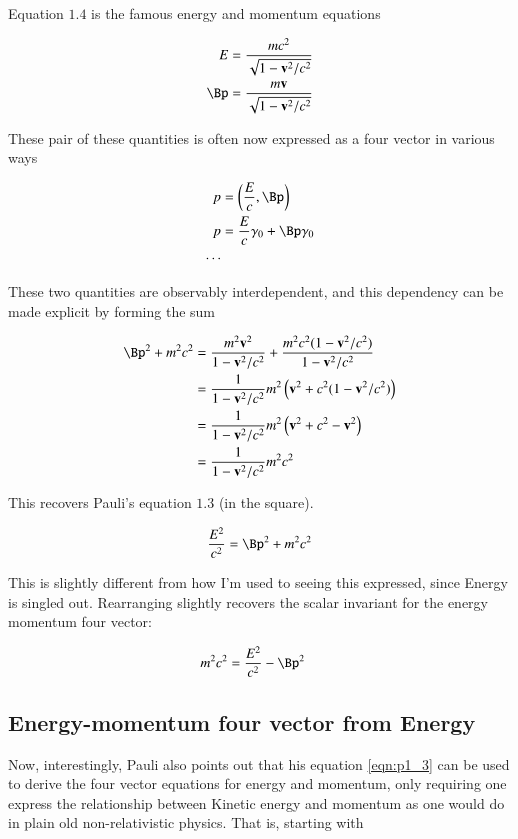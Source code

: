 Equation $1.4$ is the famous energy and momentum equations

\begin{align}\label{eqn:p1_4}
E &= \frac{ m c^2 }{\sqrt{1 - \Bv^2/c^2}} \\
\Bp &= \frac{ m \Bv }{\sqrt{1 - \Bv^2/c^2}} \\
\end{align}

These pair of these quantities is often now expressed as a four vector in various ways

\begin{align*}
p &= \left(\frac{E}{c}, \Bp \right) \\
p &= \frac{E}{c} \gamma_0 + \Bp \gamma_0 \\
\cdots
\end{align*}

These two quantities are observably interdependent, and this dependency can be made explicit by forming the sum

\begin{align*}
\Bp^2 + m^2 c^2 
&= \frac{ m^2 \Bv^2 }{{1 - \Bv^2/c^2}} +  \frac{ m^2 c^2( 1 - \Bv^2/c^2) }{{1 - \Bv^2/c^2}}  \\
&= \inv{1 - \Bv^2/c^2} m^2 \left( \Bv^2 + c^2( 1 - \Bv^2/c^2) \right) \\
&= \inv{1 - \Bv^2/c^2} m^2 \left( \Bv^2 + c^2 - \Bv^2 \right) \\
&= \inv{1 - \Bv^2/c^2} m^2 c^2 \\
\end{align*}

This recovers Pauli's equation $1.3$ (in the square).

\begin{align}\label{eqn:p1_3}
\frac{E^2}{c^2} = \Bp^2 + m^2 c^2 
\end{align}

This is slightly different from how I'm used to seeing this expressed, since Energy is singled out.
Rearranging slightly recovers the scalar invariant for the energy momentum four vector:

\begin{align*}
m^2 c^2 &= \frac{E^2}{c^2} -\Bp^2 
\end{align*}

\subsection{Energy-momentum four vector from Energy }

Now, interestingly, Pauli also points out that his equation \ref{eqn:p1_3} can be used to derive the four vector
equations for energy and momentum, only requiring one express the relationship between Kinetic energy and momentum
as one would do in plain old non-relativistic physics.  That is, starting with

